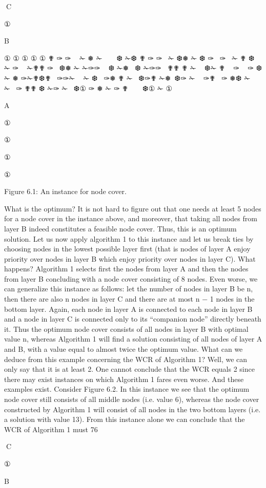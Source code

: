 C

①

B

①
①
①
①
①
✟
✑
✑
 
✁
❅
✁
 
 
❆
✁❆
✟
✑
✑
 ✁
❆❅
✁ ❆
✑ 
✑  ✁ ✟
❆   ✁ ✑   ✁✟✟
✑ 
❆❅ ✁
✁✑✑  
❆ ✁❅  ❆ ✁✑✑  ✟✟
✟
✁  
❆✁ ✟
  ✑
  ✑
❆✁ ❅
✑✁✟❆✟
 ✑✑✁  
✁ ❆  ✑❅
✟
✁  ❆✑✟ ✁❅ ❆✑ ✁  
✑✟  ✑
❅❆ ✁ 
✁ 
✑
✟✟ ❆ ✁✑
✁ 
❆①
✑
❅
✁
✑
✟
 
 
❆①
✁
①

A

①

①

①

①

Figure 6.1: An instance for node cover.

What is the optimum? It is not hard to figure out that one needs at least 5 nodes for a node cover in
the instance above, and moreover, that taking all nodes from layer B indeed constitutes a feasible node
cover. Thus, this is an optimum solution. Let us now apply algorithm 1 to this instance and let us break
ties by choosing nodes in the lowest possible layer first (that is nodes of layer A enjoy priority over nodes
in layer B which enjoy priority over nodes in layer C). What happens? Algorithm 1 selects first the nodes
from layer A and then the nodes from layer B concluding with a node cover consisting of 8 nodes. Even
worse, we can generalize this instance as follows: let the number of nodes in layer B be n, then there
are also n nodes in layer C and there are at most n − 1 nodes in the bottom layer. Again, each node in
layer A is connected to each node in layer B and a node in layer C is connected only to its “companion
node” directly beneath it. Thus the optimum node cover consists of all nodes in layer B with optimal
value n, whereas Algorithm 1 will find a solution consisting of all nodes of layer A and B, with a value
equal to almost twice the optimum value. What can we deduce from this example concerning the WCR
of Algorithm 1? Well, we can only say that it is at least 2. One cannot conclude that the WCR equals 2
since there may exist instances on which Algorithm 1 fares even worse.
And these examples exist. Consider Figure 6.2.
In this instance we see that the optimum node cover still consists of all middle nodes (i.e. value 6),
whereas the node cover constructed by Algorithm 1 will consist of all nodes in the two bottom layers (i.e.
a solution with value 13). From this instance alone we can conclude that the WCR of Algorithm 1 must
76

C

①

B

